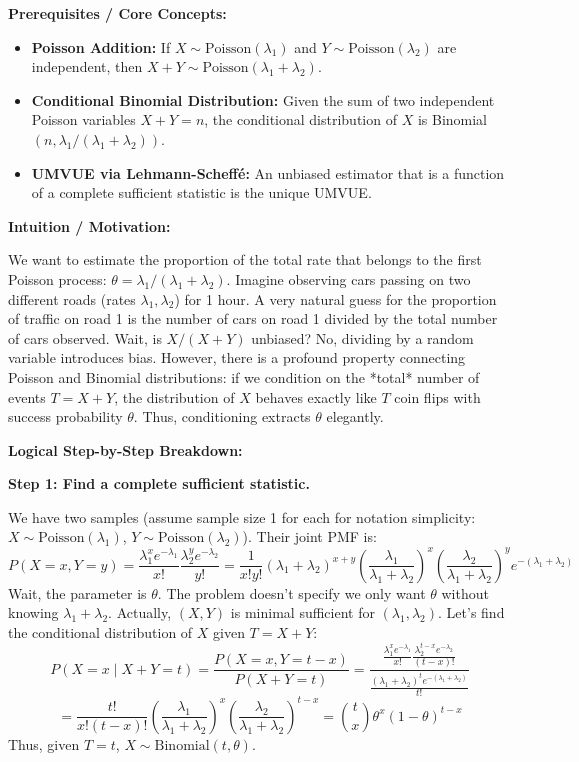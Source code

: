\begin{solution}
\textbf{Prerequisites / Core Concepts:}
\begin{itemize}
    \item \textbf{Poisson Addition:} If $X \sim \text{Poisson}(\lambda_1)$ and $Y \sim \text{Poisson}(\lambda_2)$ are independent, then $X+Y \sim \text{Poisson}(\lambda_1+\lambda_2)$.
    \item \textbf{Conditional Binomial Distribution:} Given the sum of two independent Poisson variables $X+Y=n$, the conditional distribution of $X$ is Binomial$(n, \lambda_1/(\lambda_1+\lambda_2))$.
    \item \textbf{UMVUE via Lehmann-Scheffé:} An unbiased estimator that is a function of a complete sufficient statistic is the unique UMVUE.
\end{itemize}

\textbf{Intuition / Motivation:}

We want to estimate the proportion of the total rate that belongs to the first Poisson process: $\theta = \lambda_1 / (\lambda_1 + \lambda_2)$.
Imagine observing cars passing on two different roads (rates $\lambda_1, \lambda_2$) for 1 hour. A very natural guess for the proportion of traffic on road 1 is the number of cars on road 1 divided by the total number of cars observed. Wait, is $X/(X+Y)$ unbiased? No, dividing by a random variable introduces bias. 
However, there is a profound property connecting Poisson and Binomial distributions: if we condition on the *total* number of events $T = X+Y$, the distribution of $X$ behaves exactly like $T$ coin flips with success probability $\theta$. Thus, conditioning extracts $\theta$ elegantly.

\textbf{Logical Step-by-Step Breakdown:}

\textbf{Step 1: Find a complete sufficient statistic.}

We have two samples (assume sample size 1 for each for notation simplicity: $X \sim \text{Poisson}(\lambda_1)$, $Y \sim \text{Poisson}(\lambda_2)$).
Their joint PMF is:
\[ P(X=x, Y=y) = \frac{\lambda_1^x e^{-\lambda_1}}{x!} \frac{\lambda_2^y e^{-\lambda_2}}{y!} = \frac{1}{x! y!} (\lambda_1+\lambda_2)^{x+y} \left(\frac{\lambda_1}{\lambda_1+\lambda_2}\right)^x \left(\frac{\lambda_2}{\lambda_1+\lambda_2}\right)^y e^{-(\lambda_1+\lambda_2)} \]
Wait, the parameter is $\theta$. The problem doesn't specify we only want $\theta$ without knowing $\lambda_1+\lambda_2$.
Actually, $(X, Y)$ is minimal sufficient for $(\lambda_1, \lambda_2)$.
Let's find the conditional distribution of $X$ given $T = X+Y$:
\[ P(X=x \mid X+Y=t) = \frac{P(X=x, Y=t-x)}{P(X+Y=t)} = \frac{\frac{\lambda_1^x e^{-\lambda_1}}{x!} \frac{\lambda_2^{t-x} e^{-\lambda_2}}{(t-x)!}}{\frac{(\lambda_1+\lambda_2)^t e^{-(\lambda_1+\lambda_2)}}{t!}} \]
\[ = \frac{t!}{x!(t-x)!} \left(\frac{\lambda_1}{\lambda_1+\lambda_2}\right)^x \left(\frac{\lambda_2}{\lambda_1+\lambda_2}\right)^{t-x} = \binom{t}{x} \theta^x (1-\theta)^{t-x} \]
Thus, given $T=t$, $X \sim \text{Binomial}(t, \theta)$.


\end{solution}
